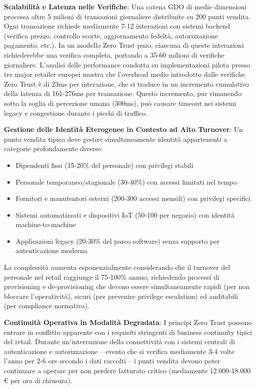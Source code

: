 \textbf{Scalabilità e Latenza nelle Verifiche}: Una catena GDO di medie dimensioni processa oltre 5 milioni di transazioni giornaliere distribuite su 200 punti vendita. Ogni transazione richiede mediamente 7-12 interazioni con sistemi backend (verifica prezzo, controllo scorte, aggiornamento fedeltà, autorizzazione pagamento, etc.). In un modello Zero Trust puro, ciascuna di queste interazioni richiederebbe una verifica completa, portando a 35-60 milioni di verifiche giornaliere. L'analisi delle performance condotta su implementazioni pilota presso tre major retailer europei mostra che l'overhead medio introdotto dalle verifiche Zero Trust è di 23ms per interazione\autocite{paloalto2024}, che si traduce in un incremento cumulativo della latenza di 161-276ms per transazione. Questo incremento, pur rimanendo sotto la soglia di percezione umana (300ms), può causare timeout nei sistemi legacy e congestione durante i picchi di traffico.

\textbf{Gestione delle Identità Eterogenee in Contesto ad Alto Turnover}: Un punto vendita tipico deve gestire simultaneamente identità appartenenti a categorie profondamente diverse:
\begin{itemize}
    \item Dipendenti fissi (15-20\% del personale) con privilegi stabili
    \item Personale temporaneo/stagionale (30-40\%) con accessi limitati nel tempo
    \item Fornitori e manutentori esterni (200-300 accessi mensili) con privilegi specifici
    \item Sistemi automatizzati e dispositivi IoT (50-100 per negozio) con identità machine-to-machine
    \item Applicazioni legacy (20-30\% del parco software) senza supporto per autenticazione moderna
\end{itemize}

La complessità aumenta esponenzialmente considerando che il turnover del personale nel retail raggiunge il 75-100\% annuo\autocite{nrf2024}, richiedendo processi di provisioning e de-provisioning che devono essere simultaneamente rapidi (per non bloccare l'operatività), sicuri (per prevenire privilege escalation) ed auditabili (per compliance normativa).

\textbf{Continuità Operativa in Modalità Degradata}: I principi Zero Trust possono entrare in conflitto apparente con i requisiti stringenti di business continuity tipici del retail. Durante un'interruzione della connettività con i sistemi centrali di autenticazione e autorizzazione – evento che si verifica mediamente 3-4 volte l'anno per 2-6 ore secondo i dati raccolti – i punti vendita devono poter continuare a operare per non perdere fatturato critico (mediamente 12.000-18.000 € per ora di chiusura).

